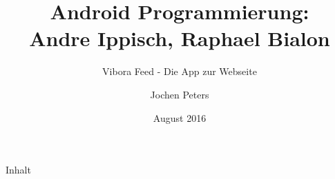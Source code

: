 \documentclass{beamer}
\title{Android Programmierung:\\ Andre Ippisch, Raphael Bialon}
\subtitle{Vibora Feed - Die App zur Webseite}
\author{Jochen Peters}
\institute{Heinrich-Heine-Universität Düsseldorf\\ Informatik MA - SS 2016}
\date{August 2016}
\makeatletter
\def\maxwidth{\ifdim\Gin@nat@width>\linewidth\linewidth
\else\Gin@nat@width\fi}
\makeatother
\begin{document}

	\begin{frame}
		\titlepage
	\end{frame}

	\begin{frame}{Inhalt}
		\tableofcontents
	\end{frame}

	\makeatother
	\let\Oldincludegraphics\includegraphics
	\renewcommand{\includegraphics}[1]{\Oldincludegraphics[width=\maxwidth]{#1}}


\end{document}
